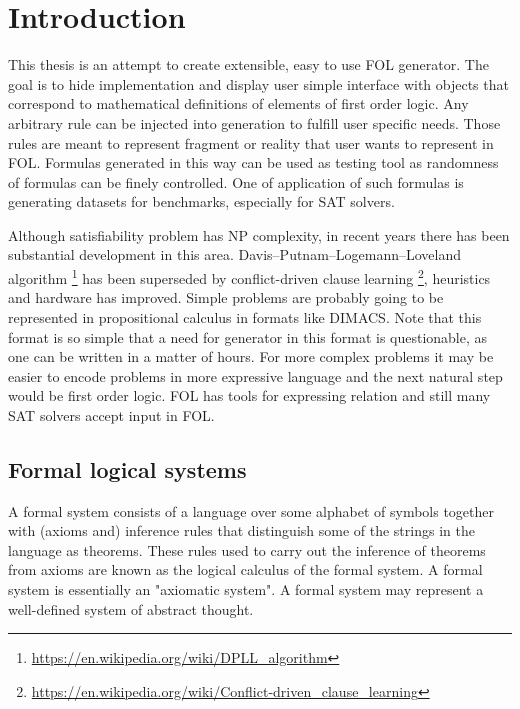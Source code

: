 \chapter{Introduction}
\label{cha:Introduction}

This thesis is an attempt to create extensible, easy to use \gls{FOL} generator. The goal is to hide implementation and display user simple interface with objects that correspond to mathematical definitions of elements of first order logic. Any arbitrary rule can be injected into generation to fulfill user specific needs. Those rules are meant to represent fragment or reality that user wants to represent in \gls{FOL}. Formulas generated in this way can be used as testing tool as randomness of formulas can be finely controlled. One of application of such formulas is generating datasets for benchmarks, especially for \gls{SAT} solvers.

Although satisfiability problem has NP complexity, in recent years there has been substantial development in this area. Davis–Putnam–Logemann–Loveland algorithm \footnote{\url{https://en.wikipedia.org/wiki/DPLL_algorithm}} has been superseded by conflict-driven clause learning \footnote{\url{https://en.wikipedia.org/wiki/Conflict-driven_clause_learning}}, heuristics and hardware has improved. Simple problems are probably going to be represented in propositional calculus in formats like DIMACS. Note that this format is so simple that a need for generator in this format is questionable, as one can be written in a matter of hours. For more complex problems it may be easier to encode problems in more expressive language and the next natural step would be first order logic. \gls{FOL} has tools for expressing relation and still many SAT solvers accept input in \gls{FOL}. 


\section{Formal logical systems}

A formal system consists of a language over some alphabet of symbols together with (axioms and) inference rules that distinguish some of the strings in the language as theorems.
These rules used to carry out the inference of theorems from axioms are known as the logical calculus of the formal system. A formal system is essentially an "axiomatic system". A formal system may represent a well-defined system of abstract thought.

